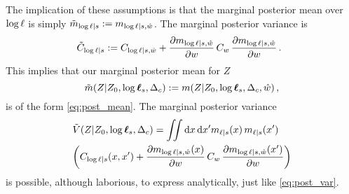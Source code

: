 \documentclass{article}
\begin{document}
The implication of these assumptions is that the marginal posterior mean over $\tr$ is simply
$
\tilde{m}_{\tr|s} \deq m_{\tr|s,\hat{w}}
$.   
The marginal posterior variance is 
\begin{equation}
\hspace{-0.2cm}
\tilde{C}_{\tr|s} 
\deq C_{\tr|s,\hat{w}}
+ 
\pderiv{m_{\tr|s,\hat{w}}}{w}
\,C_w\,
\pderiv{m_{\tr|s,\hat{w}}}{w}\,.
\end{equation}
This implies that our marginal posterior mean for $Z$ 
\begin{equation}
\tilde{m}(\If|Z_0,\tvr_s,\Delta_c) \deq \mean{\If}{Z_0,\tvr_s,\Delta_c, \hat{w}},
\end{equation}
is of the form \eqref{eq:post_mean}. The marginal posterior variance
\begin{align}
& \tilde{V}(\If|Z_0,\tvr_s,\Delta_c)=
 \iint  \ud \lfv\, \ud\lfv' m_{\lfn|s}(\lfv)\, m_{\lfn|s}(\lfv')\nonumber\\
&  
\biggl(C_{\tr|s}(\lfv,\lfv') + 
\pderiv{m_{\tr|s,\hat{w}}(x)}{w}
\,C_w\,
\pderiv{m_{\tr|s,\hat{w}}(x')}{w}
\biggr)
\end{align}
is possible, although laborious, to express analytically, just like \eqref{eq:post_var}.
\end{document}
